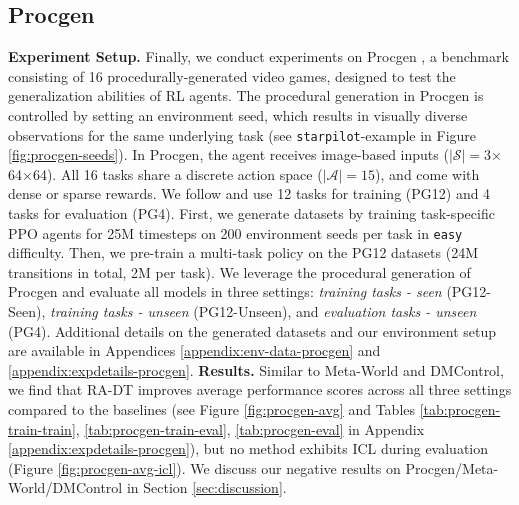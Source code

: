 \documentclass{article}
\begin{document}
\subsection{Procgen}\label{sec:exp-procgen}
\textbf{Experiment Setup.}
Finally, we conduct experiments on Procgen \citep{Cobbe:20}, a benchmark consisting
of 16 procedurally-generated video games, designed to test the generalization abilities of RL agents.
The procedural generation in Procgen is controlled by setting an environment seed, which results in visually diverse observations for the same underlying task (see \texttt{starpilot}-example in Figure \ref{fig:procgen-seeds}).
In Procgen, the agent receives image-based inputs ($|\mathcal{S}|=$3$\times$64$\times$64).
All 16 tasks share a discrete action space ($|\mathcal{A}|=15$), and come with dense or sparse rewards.
We follow \citet{Raparthy:23} and use 12 tasks for training (PG12) and 4 tasks for evaluation (PG4).
First, we generate datasets by training task-specific PPO agents for 25M timesteps on 200 environment seeds per task in \texttt{easy} difficulty.
Then, we pre-train a multi-task policy on the PG12 datasets (24M transitions in total, 2M per task).
We leverage the procedural generation of Procgen and evaluate all models in three settings: \emph{training tasks - seen} (PG12-Seen), \emph{training tasks - unseen} (PG12-Unseen), and \emph{evaluation tasks - unseen} (PG4).
Additional details on the generated datasets and our environment setup are available in Appendices \ref{appendix:env-data-procgen} and \ref{appendix:expdetails-procgen}.
\textbf{Results.}
Similar to Meta-World and DMControl, we find that RA-DT improves average performance scores across all three settings compared to the baselines (see Figure \ref{fig:procgen-avg} and Tables \ref{tab:procgen-train-train}, \ref{tab:procgen-train-eval}, \ref{tab:procgen-eval} in Appendix \ref{appendix:expdetails-procgen}), but no method exhibits ICL during evaluation (Figure \ref{fig:procgen-avg-icl}).
We discuss our negative results on Procgen/Meta-World/DMControl in Section \ref{sec:discussion}.
\end{document}
